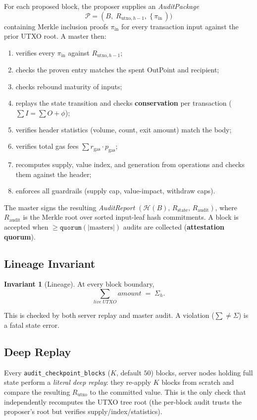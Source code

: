 \documentclass[11pt,a4paper]{article}
\theoremstyle{definition}
\newtheorem{invariant}{Invariant}
\newcommand{\outpoint}{\textsf{OutPoint}}
\newcommand{\hash}{\mathcal{H}}
\begin{document}
For each proposed block, the proposer supplies an \emph{AuditPackage}
\[
\mathcal{P} = (B,\; R_{\mathrm{utxo},h{-}1},\; \{\,\pi_{\mathrm{in}}\,))
\]
containing Merkle inclusion proofs $\pi_{\mathrm{in}}$ for every transaction
input against the prior UTXO root.  A master then:
\begin{enumerate}[label=(\arabic*),leftmargin=2em]
  \item verifies every $\pi_{\mathrm{in}}$ against $R_{\mathrm{utxo},h-1}$;
  \item checks the proven entry matches the spent \outpoint{} and recipient;
  \item checks rebound maturity of inputs;
  \item replays the state transition and checks \textbf{conservation} per
    transaction (${\sum I = \sum O + \phi}$);
  \item verifies header statistics (volume, count, exit amount) match the body;
  \item verifies total gas fees $\sum r_{\mathrm{gas}} \cdot p_{\mathrm{gas}}$;
  \item recomputes supply, value index, and generation from operations and
    checks them against the header;
  \item enforces all guardrails (supply cap, value-impact, withdraw caps).
\end{enumerate}
The master signs the resulting \emph{AuditReport}
$(\hash(B),\, R_{\mathrm{state}},\, R_{\mathrm{audit}})$, where
$R_{\mathrm{audit}}$ is the Merkle root over sorted input-leaf hash commitments.
A block is accepted when $\ge\texttt{quorum}(|\mathrm{masters}|)$ audits are
collected (\textbf{attestation quorum}).

\subsection{Lineage Invariant}
\begin{invariant}[Lineage]
At every block boundary,
\[
\sum_{\mathit{live\;UTXO}} \mathit{amount} \;=\; \Sigma_h.
\]
\end{invariant}
This is checked by both server replay and master audit.  A violation
($\sum\neq\Sigma$) is a fatal state error.

\subsection{Deep Replay}

Every \texttt{audit\_checkpoint\_blocks} ($K$, default $50$) blocks, server
nodes holding full state perform a \emph{literal deep replay}: they re-apply
$K$ blocks from scratch and compare the resulting $R_{\mathrm{utxo}}$ to the
committed value.  This is the only check that independently recomputes the UTXO
tree root (the per-block audit trusts the proposer's root but verifies
supply/index/statistics).
\end{document}

